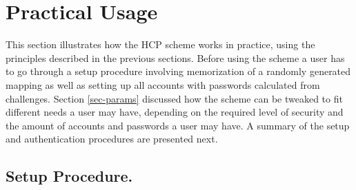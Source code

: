 \section{Practical Usage}\label{usage}
This section illustrates how the HCP scheme works in practice, using the principles described in the previous sections. Before using the scheme a user has to go through a setup procedure involving memorization of a randomly generated mapping as well as setting up all accounts with passwords calculated from challenges. Section \ref{sec-params} discussed how the scheme can be tweaked to fit different needs a user may have, depending on the required level of security and the amount of accounts and passwords a user may have. A summary of the setup and authentication procedures are presented next.
\subsection{Setup Procedure.}
